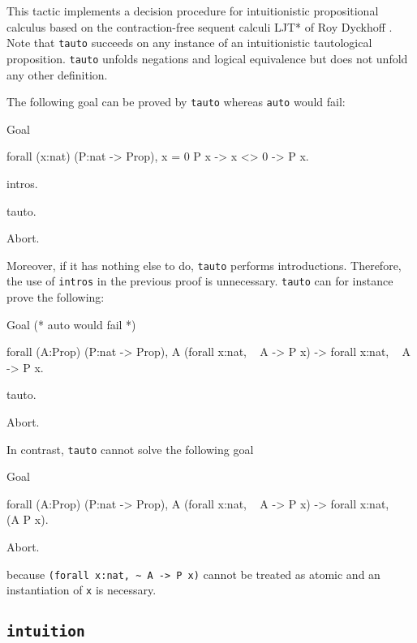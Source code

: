 This tactic implements a decision procedure for intuitionistic propositional
calculus based on the contraction-free sequent calculi LJT* of Roy Dyckhoff
\cite{Dyc92}. Note that {\tt tauto} succeeds on any instance of an
intuitionistic tautological proposition. {\tt tauto} unfolds negations
and logical equivalence but does not unfold any other definition.

The following goal can be proved by {\tt tauto} whereas {\tt auto}
would fail:

\begin{coq_example}
Goal

  forall (x:nat) (P:nat -> Prop), x = 0 \/ P x -> x <> 0 -> P x.

  intros.

  tauto.
\end{coq_example}
\begin{coq_eval}
Abort.
\end{coq_eval}

Moreover, if it has nothing else to do, {\tt tauto} performs
introductions. Therefore, the use of {\tt intros} in the previous
proof is unnecessary. {\tt tauto} can for instance prove the
following:
\begin{coq_example}
Goal
 (* auto would fail *)
  
  forall (A:Prop) (P:nat -> Prop),
    A \/ (forall x:nat, ~ A -> P x) -> forall x:nat, ~ A -> P x.

  tauto.
\end{coq_example}
\begin{coq_eval}
Abort.
\end{coq_eval}

\Rem In contrast, {\tt tauto} cannot solve the following goal

\begin{coq_example*}
Goal

  forall (A:Prop) (P:nat -> Prop),
    A \/ (forall x:nat, ~ A -> P x) -> forall x:nat, ~ ~ (A \/ P x).
\end{coq_example*}
\begin{coq_eval}
Abort.
\end{coq_eval}

because \verb=(forall x:nat, ~ A -> P x)= cannot be treated as atomic and an
instantiation of \verb=x= is necessary.

\subsection{\tt intuition {\tac}}
\label{intuition}

